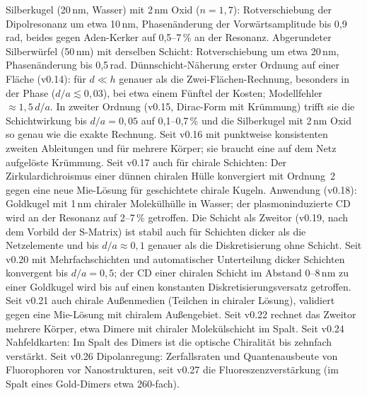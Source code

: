 \documentclass[11pt, a4paper]{article}
\newcommand{\st}[1]{{\small\sffamily[#1]}}
\begin{document}
\begin{itemize}[leftmargin=*]
    Silberkugel (20\,nm, Wasser) mit 2\,nm Oxid ($n=1{,}7$): Rotverschiebung der Dipolresonanz um etwa 10\,nm,
    Phasenänderung der Vorwärtsamplitude bis 0,9\,rad, beides gegen Aden-Kerker auf 0,5--7\,\% an der Resonanz.
    Abgerundeter Silberwürfel (50\,nm) mit derselben Schicht: Rotverschiebung um etwa 20\,nm, Phasenänderung bis
    0,5\,rad.
    Dünnschicht-Näherung erster Ordnung auf einer Fläche (v0.14): für $d\ll h$ genauer als die Zwei-Flächen-Rechnung,
    besonders in der Phase ($d/a\lesssim0{,}03$), bei etwa einem Fünftel der Kosten; Modellfehler $\approx1{,}5\,d/a$.
    In zweiter Ordnung (v0.15, Dirac-Form mit Krümmung) trifft sie die Schichtwirkung bis $d/a=0{,}05$ auf 0,1--0,7\,\%
    und die Silberkugel mit 2\,nm Oxid so genau wie die exakte Rechnung. Seit v0.16 mit punktweise konsistenten zweiten
    Ableitungen und für mehrere Körper; sie braucht eine auf dem Netz aufgelöste Krümmung. Seit v0.17 auch für chirale
    Schichten: Der Zirkulardichroismus einer dünnen chiralen Hülle konvergiert mit Ordnung~2 gegen eine neue Mie-Lösung
    für geschichtete chirale Kugeln. Anwendung (v0.18): Goldkugel mit 1\,nm chiraler Molekülhülle in Wasser;
    der plasmoninduzierte CD wird an der Resonanz auf 2--7\,\% getroffen. Die Schicht als Zweitor (v0.19, nach dem
    Vorbild der S-Matrix) ist stabil auch für Schichten dicker als die Netzelemente und bis $d/a\approx0{,}1$ genauer als
    die Diskretisierung ohne Schicht. Seit v0.20 mit Mehrfachschichten und automatischer Unterteilung dicker Schichten
    konvergent bis $d/a=0{,}5$; der CD einer chiralen Schicht im Abstand 0--8\,nm zu einer Goldkugel wird bis auf einen
    konstanten Diskretisierungsversatz getroffen. Seit v0.21 auch chirale Außenmedien (Teilchen in chiraler Lösung),
    validiert gegen eine Mie-Lösung mit chiralem Außengebiet. Seit v0.22 rechnet das Zweitor mehrere Körper, etwa Dimere mit
    chiraler Molekülschicht im Spalt. Seit v0.24 Nahfeldkarten: Im Spalt des Dimers ist die optische Chiralität bis zehnfach
    verstärkt. Seit v0.26 Dipolanregung: Zerfallsraten und Quantenausbeute von Fluorophoren vor Nanostrukturen, seit v0.27 die
    Fluoreszenzverstärkung (im Spalt eines Gold-Dimers etwa 260-fach).
    \st{numerisch}
\end{itemize}

\end{document}
